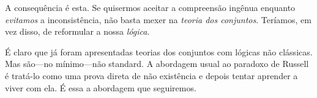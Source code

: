 \documentclass[../../../include/open-logic-section]{subfiles}
\begin{document}
A consequência é esta. Se quisermos aceitar a compreensão ingênua
enquanto \emph{evitamos} a inconsistência, não basta mexer na
\emph{teoria dos conjuntos}. Teríamos, em vez disso, de reformular a nossa
\emph{lógica}.

É claro que já foram apresentadas teorias dos conjuntos com lógicas não clássicas.
Mas são---no mínimo---não standard. A abordagem usual
ao paradoxo de Russell é tratá-lo como uma prova direta de não existência
e depois tentar aprender a viver com ela. É essa a
abordagem que seguiremos.
\end{document}
